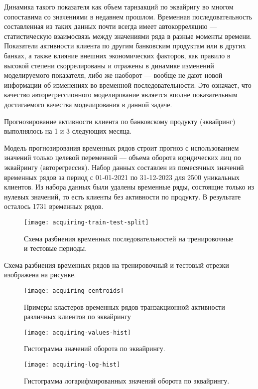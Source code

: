 Динамика такого показателя как объем тарнзакций по эквайригу во многом сопоставима со значениями в недавнем прошлом. Временная последовательность составленная из таких данных почти всегда имеет автокорреляцию --- статистическую взаимосвязь между значениями ряда в разные моменты времени.  Показатели активности клиента по другим банковским продуктам или в других банках, а также влияние внешних экономических факторов, как правило в высокой степени скоррелированы и отражены в динамике изменений моделируемого показателя, либо же наоборот --- вообще не дают новой информации об изменениях во временной последовательности. Это означает, что качество авторегрессионного моделирование является вполне показательным достигаемого качества моделирования в данной задаче.

Прогнозирование активности клиента по банковскому продукту (эквайринг) выполнялось на 1 и 3 следующих месяца.

Модель прогнозирования временных рядов строит прогноз с использованием значений только целевой переменной --- объема оборота юридических лиц по эквайрингу (авторегрессия). Набор данных составлен из помесячных значений временных рядов за период с 01-01-2021 по 31-12-2023 для 2500 уникальных клиентов. Из набора данных были удалены временные ряды, состоящие только из нулевых значений, то есть клиенты без активности по продукту. В результате осталось 1731 временных рядов.

\begin{figure}
	\centering
	\texttt{[image: acquiring-train-test-split]}
	\caption{Схема разбиения временных последовательностей на тренировочные и тестовые периоды.}
	\label{fig:acquiring-train-test-split}
\end{figure}

Схема разбиения временных рядов на тренировочный и тестовый отрезки изображена на рисунке.

\begin{figure}
	\centering
	\texttt{[image: acquiring-centroids]}
	\caption{Примеры кластеров временных рядов транзакционной активности различных клиентов по эквайрингу}
	\label{fig:acquiring-centroids}
\end{figure}

\begin{figure}[htbp]
	\centering
	\begin{minipage}{0.48\textwidth}
		\centering
		\texttt{[image: acquiring-values-hist]}
		\caption{Гистограмма значений оборота по эквайрингу.}
		\label{fig:acquiring-values-hist}
	\end{minipage}\hfill
	\begin{minipage}{0.48\textwidth}
		\centering
		\texttt{[image: acquiring-log-hist]}
		\caption{Гистограмма логарифмированных значений оборота по эквайрингу.}
		\label{fig:acquiring-log-hist}
	\end{minipage}
\end{figure}

